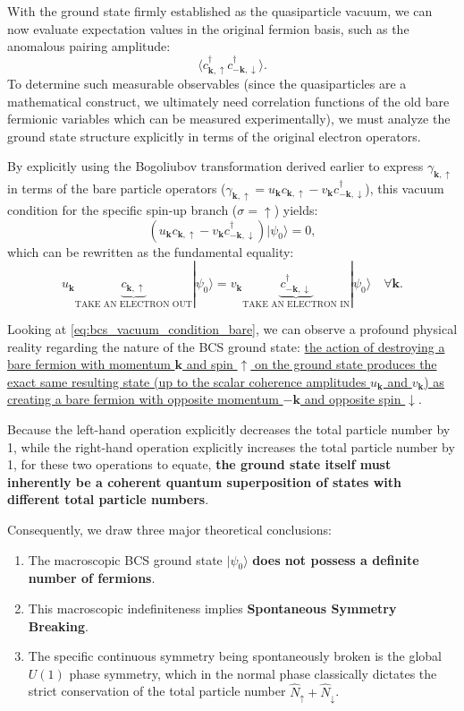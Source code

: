 With the ground state firmly established as the quasiparticle vacuum, we can now evaluate expectation values in the original fermion basis, such as the anomalous pairing amplitude:
\[
    \langle c_{\mathbf{k},\uparrow}^\dagger c_{-\mathbf{k},\downarrow}^\dagger \rangle.
\]
To determine such measurable observables (since the quasiparticles are a mathematical construct, we ultimately need correlation functions of the old bare fermionic variables which can be measured experimentally), we must analyze the ground state structure explicitly in terms of the original electron operators.

By explicitly using the Bogoliubov transformation derived earlier to express \( \gamma_{\mathbf{k},\uparrow} \) in terms of the bare particle operators (\( \gamma_{\mathbf{k},\uparrow} = u_{\mathbf{k}} c_{\mathbf{k},\uparrow} - v_{\mathbf{k}} c_{-\mathbf{k},\downarrow}^\dagger \)), this vacuum condition for the specific spin-up branch (\( \sigma = \uparrow \)) yields:
\[
    \left( u_{\mathbf{k}} c_{\mathbf{k},\uparrow} - v_{\mathbf{k}} c_{-\mathbf{k},\downarrow}^\dagger \right) |\psi_0\rangle = 0,
\]
which can be rewritten as the fundamental equality:
\begin{equation} \label{eq:bcs_vacuum_condition_bare}
    u_{\mathbf{k}} \underbrace{c_{\mathbf{k},\uparrow}}_{\text{TAKE AN ELECTRON OUT}} |\psi_0\rangle = v_{\mathbf{k}} \underbrace{c_{-\mathbf{k},\downarrow}^\dagger}_{\text{TAKE AN ELECTRON IN}} |\psi_0\rangle \quad \forall \mathbf{k}.
\end{equation}

Looking at \eqref{eq:bcs_vacuum_condition_bare}, we can observe a profound physical reality regarding the nature of the BCS ground state: \uline{the action of destroying a bare fermion with momentum \( \mathbf{k} \) and spin \( \uparrow \) on the ground state produces the exact same resulting state (up to the scalar coherence amplitudes \( u_{\mathbf{k}} \) and \( v_{\mathbf{k}} \)) as creating a bare fermion with opposite momentum \( -\mathbf{k} \) and opposite spin \( \downarrow \)}.

Because the left-hand operation explicitly decreases the total particle number by 1, while the right-hand operation explicitly increases the total particle number by 1, for these two operations to equate, \textbf{the ground state itself must inherently be a coherent quantum superposition of states with different total particle numbers}.

Consequently, we draw three major theoretical conclusions:
\begin{enumerate}
    \item The macroscopic BCS ground state \( |\psi_0\rangle \) \textbf{does not possess a definite number of fermions}.
    \item This macroscopic indefiniteness implies \textbf{Spontaneous Symmetry Breaking}.
    \item The specific continuous symmetry being spontaneously broken is the global \( U(1) \) phase symmetry, which in the normal phase classically dictates the strict conservation of the total particle number \( \hat{N}_{\uparrow} + \hat{N}_{\downarrow} \).
\end{enumerate}

